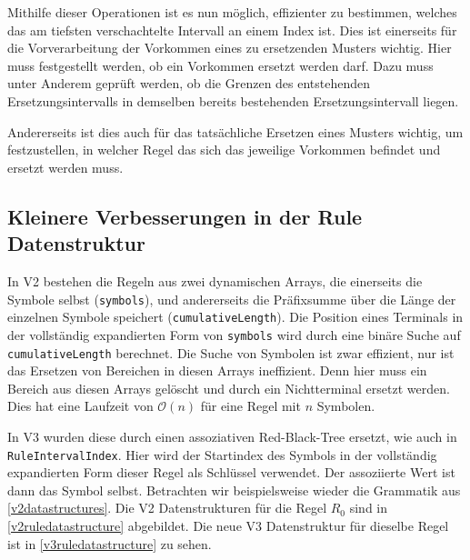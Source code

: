 































Mithilfe dieser Operationen ist es nun möglich, effizienter zu bestimmen, welches das am tiefsten verschachtelte Intervall an einem Index ist. Dies ist einerseits für die Vorverarbeitung der Vorkommen eines zu ersetzenden Musters wichtig. Hier muss festgestellt werden, ob ein Vorkommen ersetzt werden darf. Dazu muss unter Anderem geprüft werden, ob die Grenzen des entstehenden Ersetzungsintervalls in demselben bereits bestehenden Ersetzungsintervall liegen. 

Andererseits ist dies auch für das tatsächliche Ersetzen eines Musters wichtig, um festzustellen, in welcher Regel das sich das jeweilige Vorkommen befindet und ersetzt werden muss.

\subsection{Kleinere Verbesserungen in der Rule Datenstruktur}

In V2 bestehen die Regeln aus zwei dynamischen Arrays, die einerseits die Symbole selbst (\texttt{symbols}), und andererseits die Präfixsumme über die Länge der einzelnen Symbole speichert (\texttt{cumulativeLength}).
Die Position eines Terminals in der vollständig expandierten Form von \texttt{symbols} wird durch eine binäre Suche auf \texttt{cumulativeLength} berechnet. Die Suche von Symbolen ist zwar effizient, nur ist das Ersetzen von Bereichen in diesen Arrays ineffizient. Denn hier muss ein Bereich aus diesen Arrays gelöscht und durch ein Nichtterminal ersetzt werden. Dies hat eine Laufzeit von $\mathcal{O}(n)$ für eine Regel mit $n$ Symbolen.

In V3 wurden diese durch einen assoziativen Red-Black-Tree ersetzt, wie auch in \texttt{RuleIntervalIndex}. Hier wird der Startindex des Symbols in der vollständig expandierten Form dieser Regel als Schlüssel verwendet. Der assoziierte Wert ist dann das Symbol selbst. Betrachten wir beispielsweise wieder die Grammatik aus \autoref{v2datastructures}.
Die V2 Datenstrukturen für die Regel $R_0$ sind in \autoref{v2ruledatastructure} abgebildet. Die neue V3 Datenstruktur für dieselbe Regel ist in \autoref{v3ruledatastructure} zu sehen.

